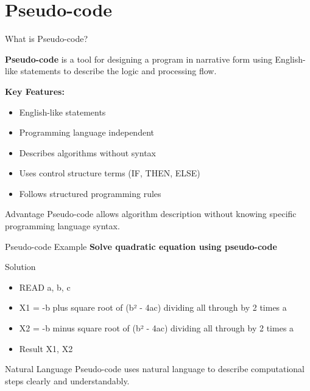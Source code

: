 \documentclass[aspectratio=169]{beamer}
\begin{document}
\section{Pseudo-code}

\begin{frame}{What is Pseudo-code?}
    \begin{definition}
        \textbf{Pseudo-code} is a tool for designing a program in narrative form using English-like statements to describe the logic and processing flow.
    \end{definition}
    
    \vspace{0.3cm}
    \textbf{Key Features:}
    \begin{itemize}
        \item English-like statements
        \item Programming language independent
        \item Describes algorithms without syntax
        \item Uses control structure terms (IF, THEN, ELSE)
        \item Follows structured programming rules
    \end{itemize}
    
    \vspace{0.2cm}
    \begin{alertblock}{Advantage}
        Pseudo-code allows algorithm description without knowing specific programming language syntax.
    \end{alertblock}
\end{frame}

\begin{frame}{Pseudo-code Example}
    \textbf{Solve quadratic equation using pseudo-code}
    
    \begin{exampleblock}{Solution}
        \begin{itemize}
            \item READ a, b, c
            \item X1 = -b plus square root of (b² - 4ac) dividing all through by 2 times a
            \item X2 = -b minus square root of (b² - 4ac) dividing all through by 2 times a
            \item Result X1, X2
        \end{itemize}
    \end{exampleblock}
    
    \vspace{0.3cm}
    \begin{block}{Natural Language}
        Pseudo-code uses natural language to describe computational steps clearly and understandably.
    \end{block}
\end{frame}
\end{document}
